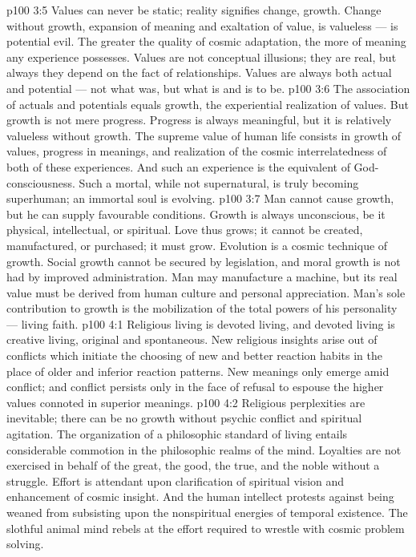 \vs p100 3:5 \pc Values can never be static; reality signifies change, growth. Change without growth, expansion of meaning and exaltation of value, is valueless --- is potential evil. The greater the quality of cosmic adaptation, the more of meaning any experience possesses. Values are not conceptual illusions; they are real, but always they depend on the fact of relationships. Values are always both actual and potential --- not what was, but what is and is to be.
\vs p100 3:6 The association of actuals and potentials equals growth, the experiential realization of values. But growth is not mere progress. Progress is always meaningful, but it is relatively valueless without growth. The supreme value of human life consists in growth of values, progress in meanings, and realization of the cosmic interrelatedness of both of these experiences. And such an experience is the equivalent of God\hyp{}consciousness. Such a mortal, while not supernatural, is truly becoming superhuman; an immortal soul is evolving.
\vs p100 3:7 Man cannot cause growth, but he can supply favourable conditions. Growth is always unconscious, be it physical, intellectual, or spiritual. Love thus grows; it cannot be created, manufactured, or purchased; it must grow. Evolution is a cosmic technique of growth. Social growth cannot be secured by legislation, and moral growth is not had by improved administration. Man may manufacture a machine, but its real value must be derived from human culture and personal appreciation. Man’s sole contribution to growth is the mobilization of the total powers of his personality --- living faith.
\vs p100 4:1 Religious living is devoted living, and devoted living is creative living, original and spontaneous. New religious insights arise out of conflicts which initiate the choosing of new and better reaction habits in the place of older and inferior reaction patterns. New meanings only emerge amid conflict; and conflict persists only in the face of refusal to espouse the higher values connoted in superior meanings.
\vs p100 4:2 Religious perplexities are inevitable; there can be no growth without psychic conflict and spiritual agitation. The organization of a philosophic standard of living entails considerable commotion in the philosophic realms of the mind. Loyalties are not exercised in behalf of the great, the good, the true, and the noble without a struggle. Effort is attendant upon clarification of spiritual vision and enhancement of cosmic insight. And the human intellect protests against being weaned from subsisting upon the nonspiritual energies of temporal existence. The slothful animal mind rebels at the effort required to wrestle with cosmic problem solving.
